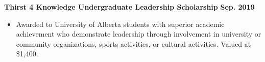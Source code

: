 \documentclass{article}
\begin{document}


\textbf{Thirst 4 Knowledge Undergraduate Leadership Scholarship} \hfill \textbf{Sep. 2019}
    \begin{itemize}
        \item Awarded to University of Alberta students with superior academic achievement who demonstrate leadership through involvement in university or community organizations, sports activities, or cultural activities. Valued at \$1,400.
    \end{itemize}

\end{document}
